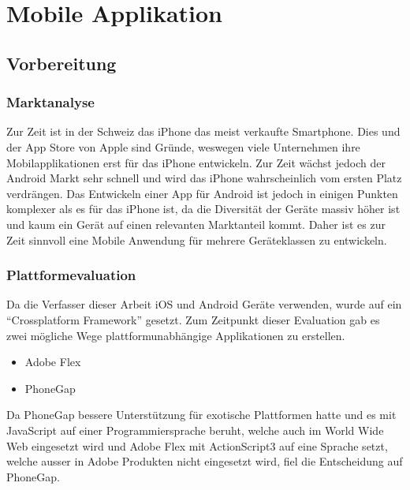 
\newpage
\section{Mobile Applikation} %
\label{sec:Mobile Applikation}

\subsection{Vorbereitung} %
\label{sub:Vorbereitung}
\subsubsection{Marktanalyse} %
\label{ssub:Marktanalyse}
Zur Zeit ist in der Schweiz das iPhone das meist verkaufte Smartphone. Dies und der App Store von Apple sind Gründe, weswegen viele Unternehmen ihre Mobilapplikationen erst für das iPhone entwickeln. Zur Zeit wächst jedoch der Android Markt sehr schnell und wird das iPhone wahrscheinlich vom ersten Platz verdrängen. Das Entwickeln einer App für Android ist jedoch in einigen Punkten komplexer als es für das iPhone ist, da die Diversität der Geräte massiv höher ist und kaum ein Gerät auf einen relevanten Marktanteil kommt. Daher ist es zur Zeit sinnvoll eine Mobile Anwendung für mehrere Geräteklassen zu entwickeln.

\subsubsection{Plattformevaluation} %
\label{ssub:Plattformevaluation}
Da die Verfasser dieser Arbeit iOS und Android Geräte verwenden, wurde auf ein "`Crossplatform Framework"' gesetzt. Zum Zeitpunkt dieser Evaluation gab es zwei mögliche Wege plattformunabhängige Applikationen zu erstellen.
\begin{itemize}
    \item Adobe Flex
    \item PhoneGap
\end{itemize}
Da PhoneGap bessere Unterstützung für exotische Plattformen hatte und es mit JavaScript auf einer Programmiersprache beruht, welche auch im World Wide Web eingesetzt wird und Adobe Flex mit ActionScript3 auf eine Sprache setzt, welche ausser in Adobe Produkten nicht eingesetzt wird, fiel die Entscheidung auf PhoneGap.

